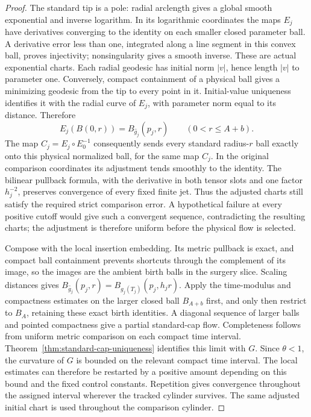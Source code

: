 \begin{proof}
The standard tip is a pole: radial arclength gives a global smooth
exponential and inverse logarithm. In its logarithmic coordinates the maps
$E_j$ have derivatives converging to the identity on each smaller closed
parameter ball. A derivative error less than one, integrated along a line
segment in this convex ball, proves injectivity; nonsingularity gives a
smooth inverse. These are actual exponential charts. Each radial geodesic
has initial norm $|v|$, hence length $|v|$ to parameter one. Conversely,
compact containment of a physical ball gives a minimizing geodesic from the
tip to every point in it. Initial-value uniqueness identifies it with the
radial curve of $E_j$, with parameter norm equal to its distance. Therefore
\[
 E_j(B(0,r))=B_{\widehat g_j}(p_j,r)
 \qquad(0<r\leq A+b).
\]
The map $C_j=E_j\circ E_0^{-1}$ consequently sends every standard
radius-$r$ ball exactly onto this physical normalized ball, for the same
map $C_j$. In the original comparison coordinates its adjustment tends
smoothly to the identity. The bilinear pullback formula, with the derivative
in both tensor slots and one factor $h_j^{-2}$, preserves convergence of
every fixed finite jet. Thus the adjusted charts still satisfy the required
strict comparison error. A hypothetical failure at every positive cutoff
would give such a convergent sequence, contradicting the resulting charts;
the adjustment is therefore uniform before the physical flow is selected.

Compose with the local insertion embedding. Its metric pullback is exact,
and compact ball containment prevents shortcuts through the complement of
its image, so the images are the ambient birth balls in the surgery slice.
Scaling distances gives
$B_{\widehat g_j}(p_j,r)=B_{g_j(T_j)}(p_j,h_jr)$.
Apply the time-modulus and compactness estimates on the larger closed ball
$B_{A+b}$ first, and only then restrict to $B_A$, retaining these exact
birth identities. A diagonal sequence of larger balls and pointed
compactness give a partial standard-cap flow.  Completeness follows
from uniform metric comparison on each compact time interval.
Theorem~\ref{thm:standard-cap-uniqueness} identifies this limit with
$G$.  Since $\theta<1$, the curvature of $G$ is bounded on the
relevant compact time interval.  The local estimates can therefore
be restarted by a positive amount depending on this bound and the
fixed control constants.  Repetition gives convergence throughout
the assigned interval wherever the tracked cylinder survives.
The same adjusted initial chart is used throughout the comparison cylinder.


\end{proof}
